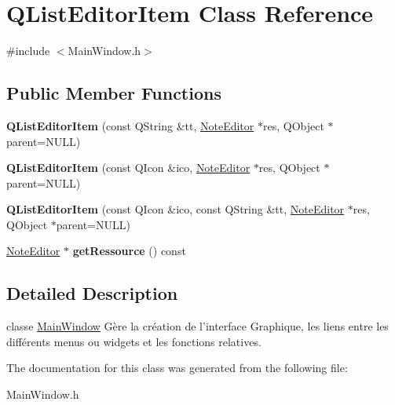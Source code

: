 \hypertarget{classQListEditorItem}{\section{\-Q\-List\-Editor\-Item \-Class \-Reference}
\label{classQListEditorItem}
}


{\ttfamily \#include $<$\-Main\-Window.\-h$>$}

\subsection*{\-Public \-Member \-Functions}
\begin{DoxyCompactItemize}
\item 
\hypertarget{classQListEditorItem_a31857393514604258864a0d60ef0a72f}{{\bfseries \-Q\-List\-Editor\-Item} (const \-Q\-String \&tt, \hyperlink{classNoteEditor}{\-Note\-Editor} $\ast$res, \-Q\-Object $\ast$parent=\-N\-U\-L\-L)}\label{classQListEditorItem_a31857393514604258864a0d60ef0a72f}

\item 
\hypertarget{classQListEditorItem_a04cef2cfa7e131d3c0162716a71a0671}{{\bfseries \-Q\-List\-Editor\-Item} (const \-Q\-Icon \&ico, \hyperlink{classNoteEditor}{\-Note\-Editor} $\ast$res, \-Q\-Object $\ast$parent=\-N\-U\-L\-L)}\label{classQListEditorItem_a04cef2cfa7e131d3c0162716a71a0671}

\item 
\hypertarget{classQListEditorItem_a6609f35d04481c8355f8469182ac0e01}{{\bfseries \-Q\-List\-Editor\-Item} (const \-Q\-Icon \&ico, const \-Q\-String \&tt, \hyperlink{classNoteEditor}{\-Note\-Editor} $\ast$res, \-Q\-Object $\ast$parent=\-N\-U\-L\-L)}\label{classQListEditorItem_a6609f35d04481c8355f8469182ac0e01}

\item 
\hypertarget{classQListEditorItem_af2de55af804abb9966ed3fe769fa822c}{\hyperlink{classNoteEditor}{\-Note\-Editor} $\ast$ {\bfseries get\-Ressource} () const }\label{classQListEditorItem_af2de55af804abb9966ed3fe769fa822c}

\end{DoxyCompactItemize}


\subsection{\-Detailed \-Description}
classe \hyperlink{classMainWindow}{\-Main\-Window} \-Gère la création de l'interface \-Graphique, les liens entre les différents menus ou widgets et les fonctions relatives. 

\-The documentation for this class was generated from the following file\-:\begin{DoxyCompactItemize}
\item 
\-Main\-Window.\-h\end{DoxyCompactItemize}

